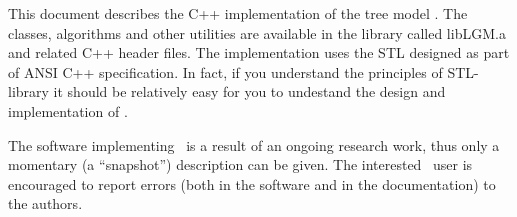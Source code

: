 This document  describes   the C++  implementation of the   tree model
\linebreak \lignum.  The  classes, algorithms and  other utilities are
available in the library called libLGM.a and related C++ header files.
The  implementation uses   the STL  designed   as  part  of  ANSI  C++
specification. In fact, if you understand  the principles of STL-library
it  should  be relatively  easy for you  to  undestand  the design and
implementation of \lignum.

The software implementing \lignum\ is a result  of an ongoing research
work,  thus only  a   momentary  (a ``snapshot'') description   can be
given. The interested  \lignum\ user  is  encouraged to  report errors
(both in the software and in the documentation) to the authors.



